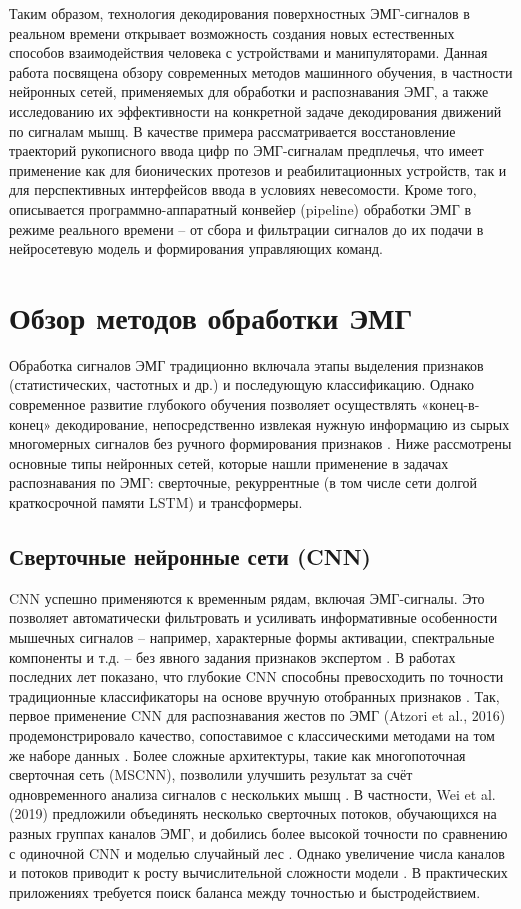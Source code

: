 \documentclass[12pt,a4paper]{article}
\begin{document}
Таким образом, технология декодирования поверхностных ЭМГ-сигналов в реальном времени открывает возможность создания новых естественных способов взаимодействия человека с устройствами и манипуляторами. Данная работа посвящена обзору современных методов машинного обучения, в частности нейронных сетей, применяемых для обработки и распознавания ЭМГ, а также исследованию их эффективности на конкретной задаче декодирования движений по сигналам мышц. В качестве примера рассматривается восстановление траекторий рукописного ввода цифр по ЭМГ-сигналам предплечья, что имеет применение как для бионических протезов и реабилитационных устройств, так и для перспективных интерфейсов ввода в условиях невесомости. Кроме того, описывается программно-аппаратный конвейер (pipeline) обработки ЭМГ в режиме реального времени – от сбора и фильтрации сигналов до их подачи в нейросетевую модель и формирования управляющих команд.


\section{Обзор методов обработки ЭМГ}
Обработка сигналов ЭМГ традиционно включала этапы выделения признаков (статистических, частотных и др.) и последующую классификацию. Однако современное развитие глубокого обучения позволяет осуществлять «конец-в-конец» декодирование, непосредственно извлекая нужную информацию из сырых многомерных сигналов без ручного формирования признаков \cite{8}. Ниже рассмотрены основные типы нейронных сетей, которые нашли применение в задачах распознавания по ЭМГ: сверточные, рекуррентные (в том числе сети долгой краткосрочной памяти LSTM) и трансформеры.


\subsection{Сверточные нейронные сети (CNN)}
CNN успешно применяются к временным рядам, включая ЭМГ-сигналы. Это позволяет автоматически фильтровать и усиливать информативные особенности мышечных сигналов – например, характерные формы активации, спектральные компоненты и т.д. – без явного задания признаков экспертом \cite{9}. В работах последних лет показано, что глубокие CNN способны превосходить по точности традиционные классификаторы на основе вручную отобранных признаков \cite{10}. Так, первое применение CNN для распознавания жестов по ЭМГ (Atzori et al., 2016) продемонстрировало качество, сопоставимое с классическими методами на том же наборе данных \cite{11}. Более сложные архитектуры, такие как многопоточная сверточная сеть (MSCNN), позволили улучшить результат за счёт одновременного анализа сигналов с нескольких мышц \cite{12}. В частности, Wei et al. (2019) предложили объединять несколько сверточных потоков, обучающихся на разных группах каналов ЭМГ, и добились более высокой точности по сравнению с одиночной CNN и моделью случайный лес \cite{13}. Однако увеличение числа каналов и потоков приводит к росту вычислительной сложности модели \cite{14}. В практических приложениях требуется поиск баланса между точностью и быстродействием.
\end{document}
